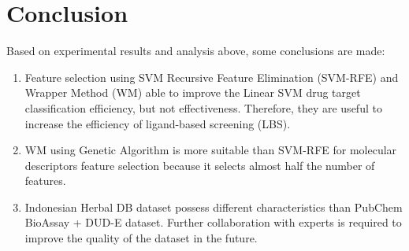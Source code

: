 \documentclass[conference]{IEEEtran}
\begin{document}
\section{Conclusion}

Based on experimental results and analysis above, some conclusions are made:

\begin{enumerate}
	\item Feature selection using SVM Recursive Feature Elimination (SVM-RFE) and Wrapper Method (WM) able to improve the Linear SVM drug target classification efficiency, but not effectiveness. Therefore, they are useful to increase the efficiency of ligand-based screening (LBS).
	\item WM using Genetic Algorithm is more suitable than SVM-RFE for molecular descriptors feature selection because it selects almost half the number of features.
	\item Indonesian Herbal DB dataset possess different characteristics than PubChem BioAssay + DUD-E dataset. Further collaboration with experts is required to improve the quality of the dataset in the future.
\end{enumerate}



\end{document}
